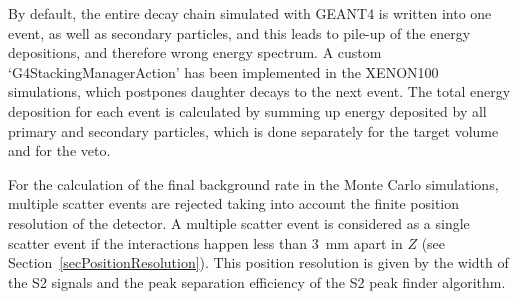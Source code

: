 By default, the entire decay chain simulated with GEANT4 is written into one event, as well as secondary particles, and this leads to pile-up of the energy depositions, and therefore wrong energy spectrum. A custom `G4StackingManagerAction' has been implemented in the XENON100 simulations, which postpones daughter decays to the next event. The total energy deposition for each event is calculated by summing up energy deposited by all primary and secondary particles, which is done separately for the target volume and for the veto. 

For the calculation of the final background rate in the Monte Carlo simulations, multiple scatter events are rejected taking into account the finite position resolution of the detector.  
A multiple scatter event is considered as a single scatter event if the interactions happen less than 3~mm apart in $Z$ (see Section~\ref{secPositionResolution}). This position resolution is given by the width of the S2 signals and the peak separation efficiency of the S2 peak finder algorithm.

